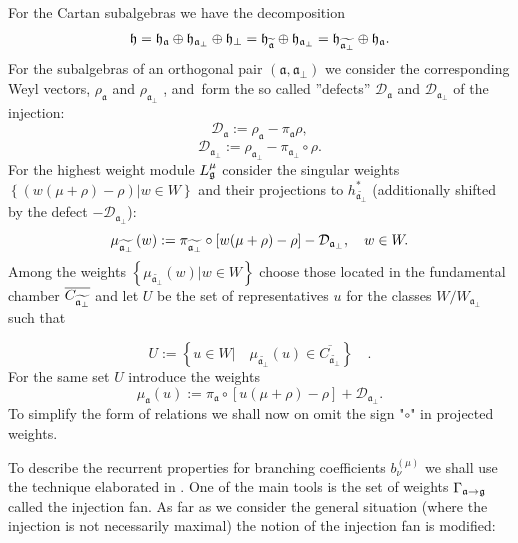 \documentclass[12pt]{iopart}
\theoremstyle{definition}
\newcommand{\af}{\mathfrak{a}}
\begin{document}
For the Cartan subalgebras we have the decomposition
\begin{equation}
\frak{h}=\frak{\frak{h}_{\af}}\oplus \frak{h}_{\af_{\perp }}\oplus
\frak{h}_{\perp }=\frak{\frak{h}_{\widetilde{\af}}}\oplus \frak{h}_{%
\af_{\perp }}=\frak{\frak{h}_{\widetilde{\af_{\perp }}}}\oplus
\frak{h}_{\af}.
\end{equation}
For the subalgebras of an orthogonal pair $\left( \af,\af_{\perp
}\right) $ we consider the corresponding Weyl vectors, $\rho _{\af}$
and $\rho _{\af_{\perp }}$ , and\ form the so called ''defects'' $%
\mathcal{D}_{\af}$ and $\mathcal{D}_{\af_{\perp }}$ of the
injection:
\begin{equation}
\mathcal{D}_{\af}:=\rho _{\af}-\pi _{\af}\rho ,
\end{equation}
\begin{equation}
\label{defect-perp}
\mathcal{D}_{\af_{\perp }}:=\rho _{\af_{\perp }}-\pi _{\af%
_{\perp }}\circ\rho .
\end{equation}
For the highest weight module $L_{\frak{g}}^{\mu }$ consider the singular
weights $\left\{\left( w(\mu +\rho )-\rho \right)|w  \in W \right\}$ and
their projections to $h_{\widetilde{\af_{\perp }}}^{\ast }$ (additionally
shifted by the defect $-\mathcal{D}_{\af_{\perp }}$):
\begin{equation*}
\mu _{\widetilde{\af_{\perp }}}\left( w\right) :=\pi _{\widetilde{\frak{%
a}_{\perp }}}\circ\left[ w(\mu +\rho )-\rho \right] -\mathcal{D}_{\af_{\perp
}},\quad w\in W.
\end{equation*}
Among the weights $\left\{\mu _{\widetilde{\af_{\perp }}}\left( w\right)
|w\in W\right\}$ choose those located in the fundamental chamber $\overline{C_{%
\widetilde{\af_{\perp }}}}$ and let $U$ be the set of representatives $%
u $ for the classes $W/W_{\af_{\perp }}$ such that

\begin{equation}
U:=\left\{ u\in W|\quad \mu _{\widetilde{\af_{\perp }}}\left( u\right)
\in \overline{C_{\widetilde{\af_{\perp }}}}\right\} \quad .
\label{U-def}
\end{equation}
For the same set $U$ introduce the weights
\begin{equation*}
\mu _{\af}\left( u\right) :=\pi _{\af}\circ\left[ u(\mu +\rho )-\rho %
\right] +\mathcal{D}_{\af_{\perp }}.
\end{equation*}
To simplify the form of relations we shall now on omit the sign "$\circ$" in projected
weights.


To describe the recurrent properties for branching coefficients $b_{\nu
}^{(\mu )}$ we shall use the technique elaborated in \cite{ilyin812pbc}. One of the
main tools is the set of weights $\Gamma _{\af\rightarrow \frak{g}%
} $ called the injection fan. As far as we consider the general situation
(where the injection is not necessarily maximal) the notion of the injection fan is
modified:
\end{document}

